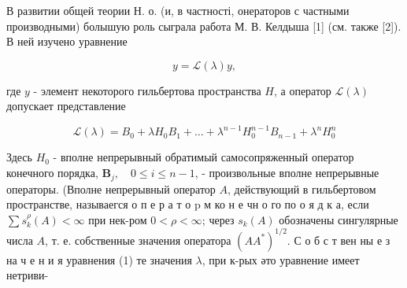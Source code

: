 \documentclass[10pt]{article}
\begin{document}
В развитии общей теории Н. о. (и, в частності, онераторов с частными производными) болышую роль сыграла работа М. В. Келдыша [1] (см. также [2]). В ней изучено уравнение



\[

y=\mathscr{L}(\lambda) y,

\]



где $y$ - элемент некоторого гильбертова пространства $H$, а оператор $\mathscr{L}(\lambda)$ допускает представление



\[

\mathscr{L}(\lambda)=B_{0}+\lambda H_{0} B_{1}+\ldots+\lambda^{n-1} H_{0}^{n-1} B_{n-1}+\lambda^{n} H_{0}^{n}

\]



Здесь $H_{0}$ - вполне непрерывный обратимый самосопряженный оператор конечного порядка, $\boldsymbol{B}_{j}, \quad 0 \leqslant i \leqslant n-1$, - произвольные вполне непрерывные операторы. (Вполне непрерывный оператор $A$, действующий в гильбертовом пространстве, называегся о п е р а т о p м ко н е чн о го по о я д к а, если $\sum s_{k}^{\rho}(A)<\infty$ при нек-ром $0<\rho<\infty$; через $s_{k}(A)$ обозначены сингулярные числа $A$, т. е. собственные значения оператора $\left(A A^{*}\right)^{1 / 2}$. С о б с т вен ны е з на ч е н и я уравнения (1) те значения $\lambda$, при к-рых әто уравнение имеет нетриви-
\end{document}
